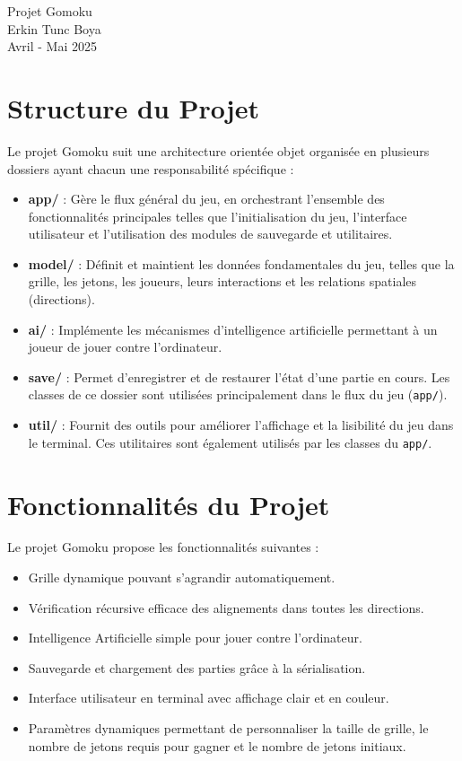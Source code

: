 \documentclass[a4paper,11pt]{article}
\begin{document}
\begin{center}
\Huge{Projet Gomoku}\\[0.5cm]
\Large{Erkin Tunc Boya}\\[0.2cm]
\Large{Avril - Mai 2025}
\end{center}

\section{Structure du Projet}

Le projet Gomoku suit une architecture orientée objet organisée en plusieurs dossiers ayant chacun une responsabilité spécifique :

\begin{itemize}
    \item \textbf{app/} : Gère le flux général du jeu, en orchestrant l'ensemble des fonctionnalités principales telles que l'initialisation du jeu, l'interface utilisateur et l'utilisation des modules de sauvegarde et utilitaires.
    \item \textbf{model/} : Définit et maintient les données fondamentales du jeu, telles que la grille, les jetons, les joueurs, leurs interactions et les relations spatiales (directions).
    \item \textbf{ai/} : Implémente les mécanismes d'intelligence artificielle permettant à un joueur de jouer contre l'ordinateur.
    \item \textbf{save/} : Permet d'enregistrer et de restaurer l'état d'une partie en cours. Les classes de ce dossier sont utilisées principalement dans le flux du jeu (\texttt{app/}).
    \item \textbf{util/} : Fournit des outils pour améliorer l'affichage et la lisibilité du jeu dans le terminal. Ces utilitaires sont également utilisés par les classes du \texttt{app/}.
\end{itemize}

\section{Fonctionnalités du Projet}

Le projet Gomoku propose les fonctionnalités suivantes :

\begin{itemize}
    \item Grille dynamique pouvant s'agrandir automatiquement.
    \item Vérification récursive efficace des alignements dans toutes les directions.
    \item Intelligence Artificielle simple pour jouer contre l'ordinateur.
    \item Sauvegarde et chargement des parties grâce à la sérialisation.
    \item Interface utilisateur en terminal avec affichage clair et en couleur.
    \item Paramètres dynamiques permettant de personnaliser la taille de grille, le nombre de jetons requis pour gagner et le nombre de jetons initiaux.
\end{itemize}
\end{document}
